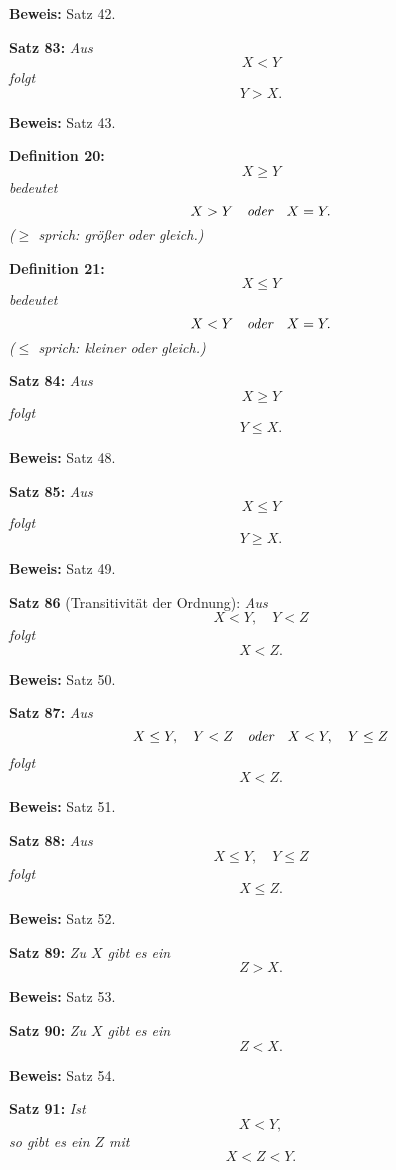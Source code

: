 {\bf Beweis:} Satz 42.
\medskip


{\bf Satz 83:} {\it Aus
$$X < Y$$
folgt
$$Y > X.$$}%

{\bf Beweis:} Satz 43.
\medskip


{\bf Definition 20:} {\it $$X \ge Y$$
bedeutet
$$X > Y\quad\hbox{\it oder}\quad X = Y.$$
{\rm ($\ge$ sprich: gr\"o{\ss}er oder gleich.)}}
\medskip


{\bf Definition 21:} {\it $$X \le Y$$
bedeutet
$$X < Y\quad\hbox{\it oder}\quad X = Y.$$
{\rm ($\le$ sprich: kleiner oder gleich.)}}
\medskip


{\bf Satz 84:} {\it Aus
$$X \ge Y$$
folgt
$$Y \le X.$$}%

{\bf Beweis:} Satz 48.
\medskip


{\bf Satz 85:} {\it Aus
$$X \le Y$$
folgt
$$Y \ge X.$$}%

{\bf Beweis:} Satz 49.
\medskip


{\bf Satz 86} (Transitivit\"at der Ordnung): {\it Aus
$$X < Y,\quad Y < Z$$
folgt
$$X < Z.$$}%

{\bf Beweis:} Satz 50.
\medskip


{\bf Satz 87:} {\it Aus
$$X \le Y,\quad Y < Z\quad\hbox{\it oder}\quad X < Y,\quad Y \le Z$$
folgt
$$X < Z.$$}%

{\bf Beweis:} Satz 51.
\medskip


{\bf Satz 88:} {\it Aus
$$X \le Y,\quad Y \le Z$$
folgt
$$X \le Z.$$}%

{\bf Beweis:} Satz 52.
\medskip


{\bf Satz 89:} {\it Zu $X$ gibt es ein
$$Z > X.$$}%

{\bf Beweis:} Satz 53.
\medskip


{\bf Satz 90:} {\it Zu $X$ gibt es ein
$$Z < X.$$}%

{\bf Beweis:} Satz 54.
\medskip


{\bf Satz 91:} {\it Ist
$$X < Y,$$
so gibt es ein $Z$ mit
$$X < Z < Y.$$}%

